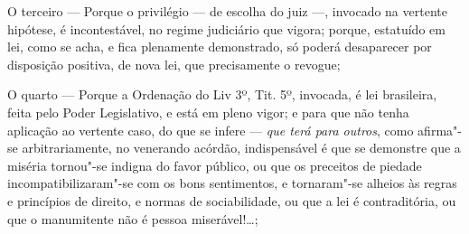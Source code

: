 O terceiro --- Porque o privilégio --- de escolha do juiz ---,
invocado na vertente hipótese, é incontestável, no regime judiciário que
vigora; porque, estatuído em lei, como se acha, e fica plenamente
demonstrado, só poderá desaparecer por disposição positiva, de nova lei,
que precisamente o revogue;

O quarto --- Porque a Ordenação do Liv 3º, Tit. 5º, invocada, é lei
brasileira, feita pelo Poder Legislativo, e está em pleno vigor; e para
que não tenha aplicação ao vertente caso, do que se infere --- \emph{que
terá para outros}, como afirma"-se arbitrariamente, no venerando acórdão,
indispensável é que se demonstre que a miséria tornou"-se indigna do
favor público, ou que os preceitos de piedade incompatibilizaram"-se com
os bons sentimentos, e tornaram"-se alheios às regras e princípios de
direito, e normas de sociabilidade, ou que a lei é contraditória, ou que
o manumitente não é pessoa miserável!\ldots{};

